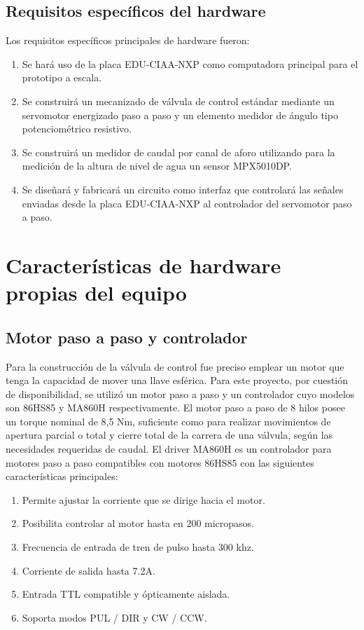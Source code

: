 \subsection{Requisitos específicos del hardware}
\label{subsec:requisitoshw}
 Los requisitos específicos principales de hardware fueron:
\begin{enumerate}
	\item Se hará uso de la placa EDU-CIAA-NXP como computadora principal para el prototipo a escala.
	\item Se construirá un mecanizado de  válvula de control estándar mediante un servomotor energizado paso a paso y un elemento medidor de ángulo tipo potenciométrico resistivo.
	\item Se construirá un medidor de caudal por canal de aforo utilizando para la medición de la altura de nivel de agua un sensor MPX5010DP.
	\item Se diseñará y fabricará un circuito como interfaz que controlará las señales enviadas desde la placa EDU-CIAA-NXP al controlador del servomotor paso a paso. 
\end{enumerate}

\section{Características de hardware propias del equipo}
\label{sec:Características propias del equipo}
\subsection{Motor paso a paso y controlador}
Para la construcción de la válvula de control fue preciso emplear un motor  que tenga la capacidad de mover una llave esférica. Para este proyecto, por cuestión de disponibilidad, se utilizó un motor paso a paso y un controlador cuyo modelos son 86HS85 y MA860H respectivamente.
El motor paso a paso de 8 hilos posee un torque nominal de 8,5 Nm, suficiente como para realizar movimientos de apertura parcial o total y cierre total de la carrera de una válvula, según las necesidades requeridas de caudal. 
El driver MA860H es un controlador para motores paso a paso compatibles con motores 86HS85 con las siguientes características principales:

\begin{enumerate}
	\item Permite ajustar la corriente que se dirige hacia el motor.
	\item Posibilita controlar al motor hasta en 200 micropasos.
	\item Frecuencia de entrada de tren de pulso hasta 300 khz. 
	\item Corriente de salida hasta 7.2A.
	\item Entrada TTL compatible y ópticamente aislada.
	\item Soporta modos PUL / DIR y CW / CCW.
\end{enumerate}

